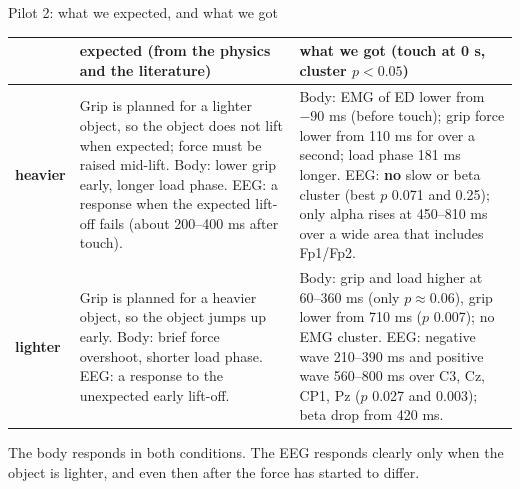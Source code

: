 \documentclass[aspectratio=169,10pt]{beamer}
\begin{document}
\begin{frame}{Pilot 2: what we expected, and what we got}
  \centering\scriptsize
  \renewcommand{\arraystretch}{1.2}
  \begin{tabular}{@{}>{\raggedright}p{14mm}>{\raggedright}p{46mm}>{\raggedright\arraybackslash}p{70mm}@{}}
    \toprule
    & expected (from the physics and the literature) & what we got (touch at 0 s, cluster $p<0.05$) \\
    \midrule
    \textbf{heavier} & Grip is planned for a lighter object, so the object does not lift when expected; force must
      be raised mid-lift. Body: lower grip early, longer load phase. EEG: a response when the expected lift-off fails
      (about 200--400 ms after touch). &
      Body: EMG of ED lower from $-90$ ms (before touch); grip force lower from 110 ms for over a second; load phase
      181 ms longer. EEG: \textbf{no} slow or beta cluster (best $p$ 0.071 and 0.25); only alpha rises at 450--810 ms
      over a wide area that includes Fp1/Fp2. \\
    \midrule
    \textbf{lighter} & Grip is planned for a heavier object, so the object jumps up early. Body: brief force overshoot,
      shorter load phase. EEG: a response to the unexpected early lift-off. &
      Body: grip and load higher at 60--360 ms (only $p\approx0.06$), grip lower from 710 ms ($p$ 0.007); no EMG
      cluster. EEG: negative wave 210--390 ms and positive wave 560--800 ms over C3, Cz, CP1, Pz ($p$ 0.027 and
      0.003); beta drop from 420 ms. \\
    \bottomrule
  \end{tabular}
  \begin{tcolorbox}[notebox,title={In short}]
    \scriptsize The body responds in both conditions. The EEG responds clearly only when the object is lighter, and
    even then after the force has started to differ.
  \end{tcolorbox}
\end{frame}
\end{document}

